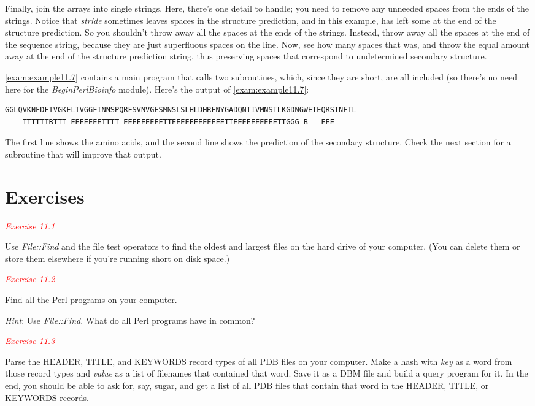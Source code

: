 Finally, join the arrays into single strings. Here, there's one detail to handle; you need to remove any unneeded spaces from the ends of the strings. Notice that \textit{stride} sometimes leaves spaces in the structure prediction, and in this example, has left some at the end of the structure prediction. So you shouldn't throw away all the spaces at the ends of the strings. Instead, throw away all the spaces at the end of the sequence string, because they are just superfluous spaces on the line. Now, see how many spaces that was, and throw the equal amount away at the end of the structure prediction string, thus preserving spaces that correspond to undetermined secondary structure.

\autoref{exam:example11.7} contains a main program that calls two subroutines, which, since they are short, are all included (so there's no need here for the \textit{BeginPerlBioinfo} module). Here's the output of \autoref{exam:example11.7}: 

\begin{lstlisting}
GGLQVKNFDFTVGKFLTVGGFINNSPQRFSVNVGESMNSLSLHLDHRFNYGADQNTIVMNSTLKGDNGWETEQRSTNFTL
    TTTTTTBTTT EEEEEEETTTT EEEEEEEEETTEEEEEEEEEEEETTEEEEEEEEEETTGGG B   EEE     
\end{lstlisting}

The first line shows the amino acids, and the second line shows the prediction of the secondary structure. Check the next section for a subroutine that will improve that output. 

\section{Exercises}
\textcolor{red}{\textit{Exercise 11.1}}
\begin{adjustwidth}{1cm}{}
Use \textit{File::Find} and the file test operators to find the oldest and largest files on the hard drive of your computer. (You can delete them or store them elsewhere if you're running short on disk space.)
\end{adjustwidth}

\textcolor{red}{\textit{Exercise 11.2}}
\begin{adjustwidth}{1cm}{}
Find all the Perl programs on your computer.

\textit{Hint}: Use \textit{File::Find}. What do all Perl programs have in common?
\end{adjustwidth}

\textcolor{red}{\textit{Exercise 11.3}}
\begin{adjustwidth}{1cm}{}
Parse the HEADER, TITLE, and KEYWORDS record types of all PDB files on your computer. Make a hash with \textit{key} as a word from those record types and \textit{value} as a list of filenames that contained that word. Save it as a DBM file and build a query program for it. In the end, you should be able to ask for, say, sugar, and get a list of all PDB files that contain that word in the HEADER, TITLE, or KEYWORDS records.
\end{adjustwidth}

